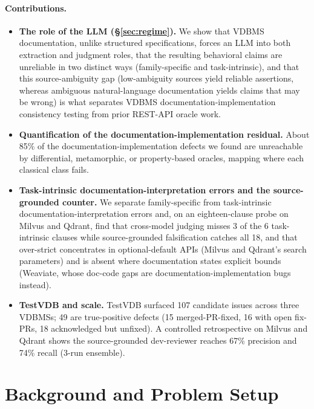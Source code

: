 \documentclass[sigconf]{acmart}
\begin{document}
\paragraph{Contributions.}
\begin{itemize}
  \item \textbf{The role of the LLM (\S\ref{sec:regime}).} We show that VDBMS documentation, unlike structured specifications, forces an LLM into both extraction and judgment roles, that the resulting behavioral claims are unreliable in two distinct ways (family-specific and task-intrinsic), and that this source-ambiguity gap (low-ambiguity sources yield reliable assertions, whereas ambiguous natural-language documentation yields claims that may be wrong) is what separates VDBMS documentation-implementation consistency testing from prior REST-API oracle work.
  \item \textbf{Quantification of the documentation-implementation residual.} About 85\% of the documentation-implementation defects we found are unreachable by differential, metamorphic, or property-based oracles, mapping where each classical class fails.
  \item \textbf{Task-intrinsic documentation-interpretation errors and the source-grounded counter.} We separate family-specific from task-intrinsic documentation-interpretation errors and, on an eighteen-clause probe on Milvus and Qdrant, find that cross-model judging misses 3 of the 6 task-intrinsic clauses while source-grounded falsification catches all 18, and that over-strict concentrates in optional-default APIs (Milvus and Qdrant's search parameters) and is absent where documentation states explicit bounds (Weaviate, whose doc-code gaps are documentation-implementation bugs instead).
  \item \textbf{TestVDB and scale.} TestVDB surfaced 107 candidate issues across three VDBMSs; 49 are true-positive defects (15 merged-PR-fixed, 16 with open fix-PRs, 18 acknowledged but unfixed). A controlled retrospective on Milvus and Qdrant shows the source-grounded dev-reviewer reaches 67\% precision and 74\% recall (3-run ensemble).
\end{itemize}

\section{Background and Problem Setup}
\end{document}
